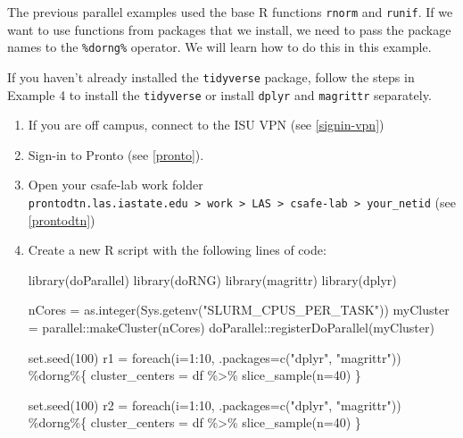 \documentclass[
]{book}
\newenvironment{Shaded}{\begin{snugshade}}{\end{snugshade}}
\newcommand{\AttributeTok}[1]{\textcolor[rgb]{0.77,0.63,0.00}{#1}}
\newcommand{\DecValTok}[1]{\textcolor[rgb]{0.00,0.00,0.81}{#1}}
\newcommand{\FunctionTok}[1]{\textcolor[rgb]{0.00,0.00,0.00}{#1}}
\newcommand{\NormalTok}[1]{#1}
\newcommand{\OtherTok}[1]{\textcolor[rgb]{0.56,0.35,0.01}{#1}}
\newcommand{\SpecialCharTok}[1]{\textcolor[rgb]{0.00,0.00,0.00}{#1}}
\newcommand{\StringTok}[1]{\textcolor[rgb]{0.31,0.60,0.02}{#1}}
\begin{document}
The previous parallel examples used the base R functions \texttt{rnorm} and \texttt{runif}. If we want to use
functions from packages that we install, we need to pass the package names to the \texttt{\%dorng\%} operator. We will learn how to do this in this example.

If you haven't already installed the \texttt{tidyverse} package, follow the steps in Example 4 to install the \texttt{tidyverse} or install \texttt{dplyr} and \texttt{magrittr} separately.

\begin{enumerate}
\def\labelenumi{\arabic{enumi}.}
\item
  If you are off campus, connect to the ISU VPN (see \ref{signin-vpn})
\item
  Sign-in to Pronto (see \ref{pronto}).
\item
  Open your csafe-lab work folder \texttt{prontodtn.las.iastate.edu\ \textgreater{}\ work\ \textgreater{}\ LAS\ \textgreater{}\ csafe-lab\ \textgreater{}\ your\_netid} (see \ref{prontodtn})
\item
  Create a new R script with the following lines of code:

\begin{Shaded}
\begin{Highlighting}[]
\FunctionTok{library}\NormalTok{(doParallel)}
\FunctionTok{library}\NormalTok{(doRNG)}
\FunctionTok{library}\NormalTok{(magrittr)}
\FunctionTok{library}\NormalTok{(dplyr)}

\NormalTok{nCores }\OtherTok{=} \FunctionTok{as.integer}\NormalTok{(}\FunctionTok{Sys.getenv}\NormalTok{(}\StringTok{"SLURM\_CPUS\_PER\_TASK"}\NormalTok{))}
\NormalTok{myCluster }\OtherTok{=}\NormalTok{ parallel}\SpecialCharTok{::}\FunctionTok{makeCluster}\NormalTok{(nCores)}
\NormalTok{doParallel}\SpecialCharTok{::}\FunctionTok{registerDoParallel}\NormalTok{(myCluster)}

\FunctionTok{set.seed}\NormalTok{(}\DecValTok{100}\NormalTok{)}
\NormalTok{r1 }\OtherTok{=} \FunctionTok{foreach}\NormalTok{(}\AttributeTok{i=}\DecValTok{1}\SpecialCharTok{:}\DecValTok{10}\NormalTok{, }\AttributeTok{.packages=}\FunctionTok{c}\NormalTok{(}\StringTok{"dplyr"}\NormalTok{, }\StringTok{"magrittr"}\NormalTok{)) }\SpecialCharTok{\%dorng\%}\NormalTok{\{ }
\NormalTok{  cluster\_centers }\OtherTok{=}\NormalTok{ df }\SpecialCharTok{\%\textgreater{}\%} \FunctionTok{slice\_sample}\NormalTok{(}\AttributeTok{n=}\DecValTok{40}\NormalTok{)}
\NormalTok{\}}

\FunctionTok{set.seed}\NormalTok{(}\DecValTok{100}\NormalTok{)}
\NormalTok{r2 }\OtherTok{=} \FunctionTok{foreach}\NormalTok{(}\AttributeTok{i=}\DecValTok{1}\SpecialCharTok{:}\DecValTok{10}\NormalTok{, }\AttributeTok{.packages=}\FunctionTok{c}\NormalTok{(}\StringTok{"dplyr"}\NormalTok{, }\StringTok{"magrittr"}\NormalTok{)) }\SpecialCharTok{\%dorng\%}\NormalTok{\{ }
\NormalTok{  cluster\_centers }\OtherTok{=}\NormalTok{ df }\SpecialCharTok{\%\textgreater{}\%} \FunctionTok{slice\_sample}\NormalTok{(}\AttributeTok{n=}\DecValTok{40}\NormalTok{)}
\NormalTok{\}}


\end{Highlighting}
\end{Shaded}
\end{enumerate}
\end{document}
